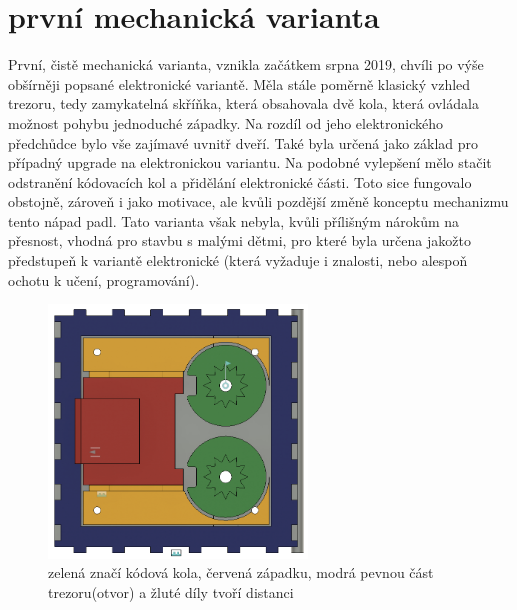 \section*{první mechanická varianta}
První, čistě mechanická varianta, vznikla začátkem srpna 2019, chvíli po výše obšírněji popsané elektronické variantě.
Měla stále poměrně klasický vzhled trezoru, tedy zamykatelná skříňka, která obsahovala dvě kola, která ovládala možnost pohybu jednoduché západky.
Na rozdíl od jeho elektronického předchůdce bylo vše zajímavé uvnitř dveří. Také byla určená jako základ pro případný upgrade na elektronickou
variantu. Na podobné vylepšení mělo stačit odstranění kódovacích kol a přidělání elektronické části. Toto sice fungovalo obstojně, zároveň 
i jako motivace, ale kvůli pozdější změně konceptu mechanizmu tento nápad padl.
Tato varianta však nebyla, kvůli přílišným nárokům na přesnost, vhodná pro stavbu s malými dětmi, pro které byla určena jakožto předstupeň 
k variantě elektronické (která vyžaduje i znalosti, nebo alespoň ochotu k učení, programování).

\begin{figure}[htbp]
    \centering
    \includegraphics[width=260]{kapitoly/obrazky/M1/mechanizmus.png}
    \caption{zelená značí kódová kola, červená západku, modrá pevnou část trezoru(otvor) a žluté díly tvoří distanci}
    \label{fig:M1-mechanizmus}
\end{figure}
\newpage